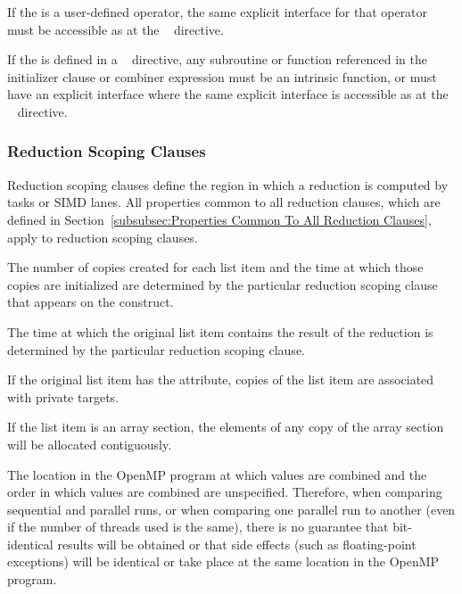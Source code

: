 \begin{itemize}
\begin{fortranspecific}
\item If the  is a user-defined operator, the same
explicit interface for that operator must be accessible as at the
~ directive.

\item If the  is defined in a ~
directive, any subroutine or function referenced in the initializer clause or
combiner expression must be an intrinsic function, or must have an explicit
interface where the same explicit interface is accessible as at the
~ directive.
\end{fortranspecific}
\end{itemize}










\subsubsection{Reduction Scoping Clauses}
\label{subsubsec:Reduction Scoping Clauses}
Reduction scoping clauses define the region in which a reduction is computed by
tasks or SIMD lanes. All properties common to all reduction clauses,
which are defined in Section~\ref{subsubsec:Properties Common To All Reduction
Clauses}, apply to reduction scoping clauses.

The number of copies created for each list item and the time at which those
copies are initialized are determined by the particular reduction scoping clause
that appears on the construct.

The time at which the original list item contains the result of the reduction
is determined by the particular reduction scoping clause.

\begin{samepage}
\begin{fortranspecific}
If the original list item has the  attribute, copies of
the list item are associated with private targets.
\end{fortranspecific}
\end{samepage}

If the list item is an array section, the elements of any copy of the array section will
be allocated contiguously.

The location in the OpenMP program at which values are combined and the
order in which values are combined are unspecified. Therefore, when
comparing sequential and parallel runs, or when comparing one parallel run to
another (even if the number of threads used is the same), there is no guarantee
that bit-identical results will be obtained or that side effects (such as
floating-point exceptions) will be identical or take place at the same location
in the OpenMP program.

